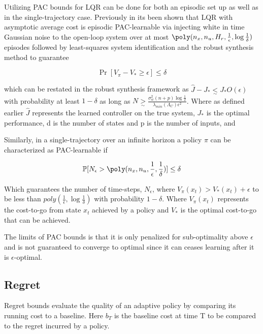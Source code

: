 \documentclass{article}[12pt]
\begin{document}
Utilizing PAC bounds for LQR can be done for both an episodic set up as well as in the single-trajectory case. Previously in \cite{DeanEtAl17} its been shown that LQR with asymptotic average cost is episodic PAC-learnable via injecting white in time Gaussian noise to the open-loop system over at most $\poly(n_x,n_u,H_r,\frac{1}{\epsilon},\log{\frac{1}{\delta}})$ episodes followed by least-squares system identification and the robust synthesis method to guarantee

\begin{equation}
    \Pr[V_{\pi} - V_{*} \geq \epsilon] \leq \delta
\end{equation}

which can be restated in the robust synthesis framework as $\hat{J} - J_{*} \underset{\sim}{<} J_{*}O(\epsilon)$ with probability at least $1-\delta$ as long as $N \underset{\sim}{>} \frac{\sigma_{w}^2(n+p)\log{\frac{1}{\delta}}}{\lambda_{min}(\Lambda_C)\epsilon^2}$. Where as defined earlier $\hat{J}$ represents the learned controller on the true system, $J_{*}$ is the optimal performance, d is the number of states and p is the number of inputs, and 

Similarly, in a single-trajectory over an infinite horizon a policy $\pi$ can be characterized as PAC-learnable if

\begin{equation}
   \Pr[N_{\epsilon} > \poly(n_x,n_u,\frac{1}{\epsilon},\frac{1}{\delta})] \leq \delta
\end{equation}

Which guarantees the number of time-steps, $N_{\epsilon}$, where $V_{\pi}(x_t) > V_{*}(x_t) + \epsilon$ to be less than $poly(\frac{1}{\epsilon},\log{\frac{1}{\delta}})$ with probability $1- \delta$. Where $V_{\pi}(x_t)$ represents the cost-to-go from state $x_t$ achieved by a policy and $V_{*}$ is the optimal cost-to-go that can be achieved.

The limits of PAC bounds is that it is only penalized for sub-optimality above $\epsilon$ and is not guaranteed to converge to optimal since it can ceases learning after it is $\epsilon$-optimal.

\subsection{Regret}
Regret bounds evaluate the quality of an adaptive policy by comparing its running cost to a baseline. Here $b_T$ is the baseline cost at time T to be compared to the regret incurred by a policy.
\end{document}
